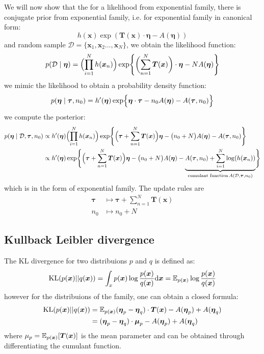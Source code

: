 We will now show that the for a likelihood from exponential family, there is conjugate prior from exponential family, i.e. for exponential family in canonical form: 
$$
h(\boldsymbol{x}) \exp( \boldsymbol{T}(\boldsymbol{x}) \cdot \boldsymbol{\eta} - A(\boldsymbol{\eta}))
$$
and random sample $\mathcal{D} = \{\boldsymbol{x}_1,\boldsymbol{x}_2\dots,\boldsymbol{x}_N\}$, we obtain the likelihood function:
$$
p(\mathcal{D}\mid \boldsymbol{\eta}) = \Bigl(\prod_{i=1}^N h(\boldsymbol{x}_n)\Bigr) \exp \Biggl\{ \biggl( \sum_{n=1}^N \boldsymbol{T}(\boldsymbol{x}) \biggr) \cdot \boldsymbol{\eta} - N A(\boldsymbol{\eta}) \Biggr\}
$$
we mimic the likelihood to obtain a probability density function:
$$ 
p(\boldsymbol{\eta} \mid \boldsymbol{\tau},n_0) = h^\prime(\boldsymbol{\eta}) \exp \Bigl\{ \boldsymbol{\eta} \cdot \boldsymbol{\tau} - n_0 A(\boldsymbol{\eta}) - A(\boldsymbol{\tau}, n_0)\Bigr\}
$$
we compute the posterior:
\begin{align*}
    p(\boldsymbol{\eta} \mid \mathcal{D},\boldsymbol{\tau},n_0) &\propto h^\prime(\boldsymbol{\eta})\Bigl(\prod_{i=1}^N h(\boldsymbol{x}_n)\Bigr) \exp \Biggl\{  \Bigl( \boldsymbol{\tau} +\sum_{n=1}^N \boldsymbol{T}(\boldsymbol{x}) \Bigr) \boldsymbol{\eta} - \bigl( n_0 + N\bigr)A(\boldsymbol{\eta}) - A(\boldsymbol{\tau}, n_0) \Biggr\}\\
 &\propto h^\prime(\boldsymbol{\eta}) \exp \Biggl\{  \Bigl( \boldsymbol{\tau} +\sum_{n=1}^N \boldsymbol{T}(\boldsymbol{x}) \Bigr) \boldsymbol{\eta} - \bigl( n_0 + N\bigr)A(\boldsymbol{\eta}) - \underbrace{A(\boldsymbol{\tau}, n_0) + \sum_{i=1}^{N} \log (h(\boldsymbol{x}_n))}_{\text{cumulant function}\,A(\mathcal{D},\boldsymbol{\tau},n_0)} \Biggr\}
\end{align*}
which is in the form of exponential family. The update rules are
\begin{align*}
\boldsymbol{\tau} &\mapsto \boldsymbol{\tau}  +\sum_{n=1}^N \boldsymbol{T}(\boldsymbol{x}) \\
n_0 &\mapsto n_0 + N 
\end{align*}
\subsection*{Kullback Leibler divergence}
The KL divergence for two distribuions $p$ and $q$ is defined as:
$$
\mathrm{KL}(p(\boldsymbol{x}) || q(\boldsymbol{x})) = \int_x p(\boldsymbol{x}) \log \frac{p(\boldsymbol{x})}{q(\boldsymbol{x})} \mbox{\rm d}\boldsymbol{x} 
= \operatorname{\mathbb{E}}_{p(\boldsymbol{x})} \log \frac{p(\boldsymbol{x})}{q(\boldsymbol{x})} 
$$
however for the distribuions of the family, one can obtain a closed formula:
\begin{align*}
    \mathrm{KL}(p(\boldsymbol{x}) || q(\boldsymbol{x})) &= \operatorname{\mathbb{E}}_{p(\boldsymbol{x})} (\boldsymbol{\eta}_p - \boldsymbol{\eta}_q) \cdot  \boldsymbol{T}(\boldsymbol{x}) - A(\boldsymbol{\eta}_p) + A(\boldsymbol{\eta}_q) \\
    &= (\boldsymbol{\eta}_p - \boldsymbol{\eta}_q) \cdot  \boldsymbol{\mu}_p - A(\boldsymbol{\eta}_p) + A(\boldsymbol{\eta}_q) \\
\end{align*}
where $\mu_p =\operatorname{\mathbb{E}}_{p(\boldsymbol{x})}[\boldsymbol{T}(\boldsymbol{x})] $ is the mean parameter and can be obtained through differentiating the cumulant function. 

